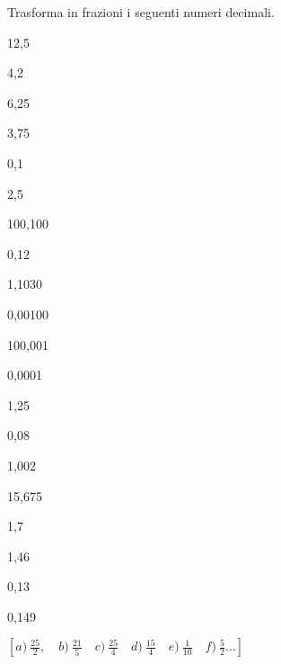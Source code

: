 \begin{esercizio}[*]
\label{ese:3.21}
Trasforma in frazioni i seguenti numeri decimali.

\begin{htmulticols}{5}
\begin{enumeratees}
 \item 12,5
 \item 4,2
 \item 6,25
 \item 3,75
 \item 0,1
 \item 2,5
 \item 100,100
 \item 0,12
 \item 1,1030
 \item 0,00100
 \item 100,001
 \item 0,0001
 \item 1,25
 \item 0,08
 \item 1,002
 \item 15,675
 \item 1,7
 \item 1,46
 \item 0,13
 \item 0,149
\end{enumeratees}
\end{htmulticols}
\(\left[a)~\frac{25}{2},\quad b)~\frac{21}{5}\quad c)~\frac{25}{4}\quad 
d)~\frac{15}{4}\quad e)~\frac{1}{10}\quad f)~\frac{5}{2} \dots \right]\)
\end{esercizio}

% 



